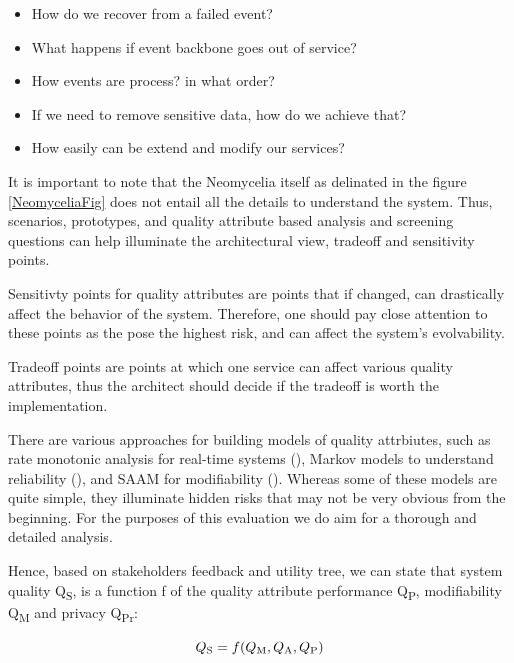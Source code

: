 \documentclass[conference]{IEEEtran}
\begin{document}
\begin{itemize}
    \item How do we recover from a failed event?
    \item What happens if event backbone goes out of service?
    \item How events are process? in what order?
    \item If we need to remove sensitive data, how do we achieve that?
    \item How easily can be extend and modify our services?
\end{itemize}

It is important to note that the Neomycelia itself as delinated in the figure \ref{NeomyceliaFig} does not entail all the details to understand the system. Thus, scenarios, prototypes, and quality attribute based analysis and screening questions can help illuminate the architectural view, tradeoff and sensitivity points. \cite{KazmanATAM}

Sensitivty points for quality attributes are points that if changed, can drastically affect the behavior of the system. Therefore, one should pay close attention to these points as the pose the highest risk, and can affect the system's evolvability.

Tradeoff points are points at which one service can affect various quality attributes, thus the architect should decide if the tradeoff is worth the implementation.

There are various approaches for building models of quality attrbiutes, such as rate monotonic analysis for real-time systems (\cite{klein1993guide}), Markov models to understand reliability (\cite{iannino1994software}), and SAAM for modifiability (\cite{kazman1994saam}). Whereas some of these models are quite simple, they illuminate hidden risks that may not be very obvious from the beginning. For the purposes of this evaluation we do aim for a thorough and detailed analysis.

Hence, based on stakeholders feedback and utility tree, we can state that system quality Q\textsubscript{S}, is a function f of the quality attribute performance Q\textsubscript{P}, modifiability Q\textsubscript{M} and privacy Q\textsubscript{Pr}:

\begin{equation}
    Q\textsubscript{S} = f(Q\textsubscript{M}, Q\textsubscript{A}, Q\textsubscript{P})
\end{equation}
\end{document}
